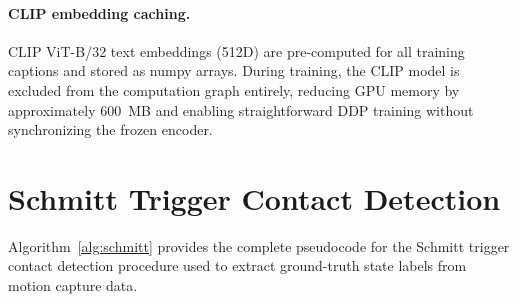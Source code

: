 \documentclass[sigconf, screen, review, anonymous]{acmart}
\begin{document}
\paragraph{CLIP embedding caching.}
CLIP ViT-B/32 text embeddings (512D) are pre-computed for all training captions and stored as numpy arrays. During training, the CLIP model is excluded from the computation graph entirely, reducing GPU memory by approximately 600~MB and enabling straightforward DDP training without synchronizing the frozen encoder.


\section{Schmitt Trigger Contact Detection}
\label{sec:schmitt}

Algorithm~\ref{alg:schmitt} provides the complete pseudocode for the Schmitt trigger contact detection procedure used to extract ground-truth state labels from motion capture data.
\end{document}
